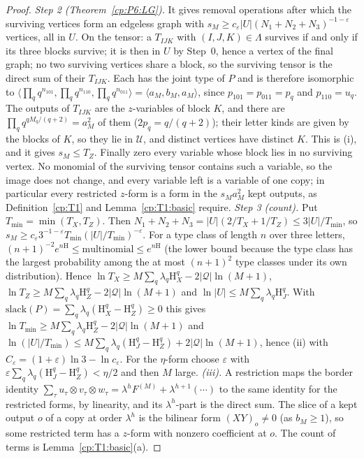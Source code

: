 \documentclass[11pt]{article}
\theoremstyle{definition}
\theoremstyle{remark}
\providecommand{\eps}{\varepsilon}
\newcommand{\abs}[1]{\lvert #1\rvert}
\newcommand{\Ent}{\mathrm{H}}                 %
\newcommand{\mat}[3]{\langle #1,#2,#3\rangle} %
\newcommand{\Qs}{\mathcal{Q}}                 %
\newcommand{\slack}{\mathrm{slack}}           %
\newcommand{\Ukept}{\mathcal{U}}              %
\begin{document}
\begin{proof}
\emph{Step 2 (Theorem~\ref{cp:P6:LG}).} It gives removal operations after which the surviving vertices form an edgeless graph with $s_M\ge c_\eps\abs U(N_1+N_2+N_3)^{-1-\eps}$ vertices, all in $U$. On the tensor: a $T_{IJK}$ with $(I,J,K)\in\Lambda$ survives if and only if its three blocks survive; it is then in $U$ by Step~0, hence a vertex of the final graph; no two surviving vertices share a block, so the surviving tensor is the direct sum of their $T_{IJK}$. Each has the joint type of $P$ and is therefore isomorphic to $\mat{\prod_qq^{n_{101}}}{\prod_qq^{n_{110}}}{\prod_qq^{n_{011}}}=\mat{a_M}{b_M}{a_M}$, since $p_{101}=p_{011}=p_q$ and $p_{110}=u_q$. The outputs of $T_{IJK}$ are the $z$-variables of block $K$, and there are $\prod_qq^{qM_q/(q+2)}=a_M^2$ of them ($2p_q=q/(q+2)$); their letter kinds are given by the blocks of $K$, so they lie in $\Ukept$, and distinct vertices have distinct $K$. This is (i), and it gives $s_M\le T_Z$. Finally zero every variable whose block lies in no surviving vertex. No monomial of the surviving tensor contains such a variable, so the image does not change, and every variable left is a variable of one copy; in particular every restricted $z$-form is a form in the $s_Ma_M^2$ kept outputs, as Definition~\ref{cp:T1} and Lemma~\ref{cp:T1:basic} require.
\emph{Step 3 (count).} Put $T_{\min}=\min(T_X,T_Z)$. Then $N_1+N_2+N_3=\abs U(2/T_X+1/T_Z)\le3\abs U/T_{\min}$, so $s_M\ge c_\eps3^{-1-\eps}T_{\min}(\abs U/T_{\min})^{-\eps}$. For a type class of length $n$ over three letters, $(n+1)^{-2}e^{n\Ent}\le\text{multinomial}\le e^{n\Ent}$ (the lower bound because the type class has the largest probability among the at most $(n+1)^2$ type classes under its own distribution). Hence $\ln T_X\ge M\sum_q\lambda_q\Ent^q_X-2\abs\Qs\ln(M+1)$, $\ln T_Z\ge M\sum_q\lambda_q\Ent^q_Z-2\abs\Qs\ln(M+1)$ and $\ln\abs U\le M\sum_q\lambda_q\Ent^q_J$. With $\slack(P)=\sum_q\lambda_q(\Ent^q_X-\Ent^q_Z)\ge0$ this gives $\ln T_{\min}\ge M\sum_q\lambda_q\Ent^q_Z-2\abs\Qs\ln(M+1)$ and $\ln(\abs U/T_{\min})\le M\sum_q\lambda_q(\Ent^q_J-\Ent^q_Z)+2\abs\Qs\ln(M+1)$, hence (ii) with $C_\eps=(1+\eps)\ln3-\ln c_\eps$. For the $\eta$-form choose $\eps$ with $\eps\sum_q\lambda_q(\Ent^q_J-\Ent^q_Z)<\eta/2$ and then $M$ large.
\emph{(iii).} A restriction maps the border identity $\sum_\tau u_\tau\otimes v_\tau\otimes w_\tau=\lambda^{h}F^{(M)}+\lambda^{h+1}(\cdots)$ to the same identity for the restricted forms, by linearity, and its $\lambda^h$-part is the direct sum. The slice of a kept output $o$ of a copy at order $\lambda^h$ is the bilinear form $(XY)_o\ne0$ (as $b_M\ge1$), so some restricted term has a $z$-form with nonzero coefficient at $o$. The count of terms is Lemma~\ref{cp:T1:basic}(a).
\end{proof}
\end{document}
